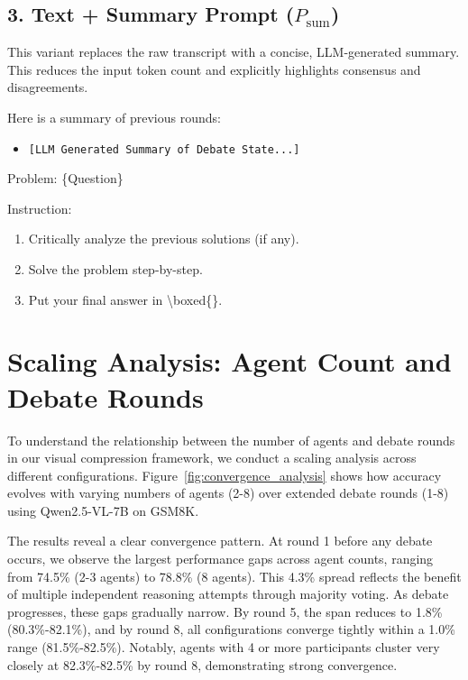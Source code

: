 \documentclass{article}
\theoremstyle{plain}
\theoremstyle{definition}
\theoremstyle{remark}
\begin{document}
\subsection{3. Text + Summary Prompt ($P_{\text{sum}}$)}
This variant replaces the raw transcript with a concise, LLM-generated summary. This reduces the input token count and explicitly highlights consensus and disagreements.

\begin{tcolorbox}[colback=gray!5!white,colframe=gray!50!black,title=\textbf{Summary Prompt Template}]
\small\ttfamily
Here is a summary of previous rounds:
\begin{itemize}[leftmargin=*,label={},noitemsep]
    \item \texttt{[LLM Generated Summary of Debate State...]}
\end{itemize}

Problem: \{Question\}

Instruction:
\begin{enumerate}[leftmargin=*,label=\arabic*.,noitemsep]
    \item Critically analyze the previous solutions (if any).
    \item Solve the problem step-by-step.
    \item Put your final answer in \textbackslash boxed\{\}.
\end{enumerate}
\end{tcolorbox}



\section{Scaling Analysis: Agent Count and Debate Rounds}
\label{sect:scale}

To understand the relationship between the number of agents and debate rounds in our visual compression framework, we conduct a scaling analysis across different configurations. Figure~\ref{fig:convergence_analysis} shows how accuracy evolves with varying numbers of agents (2-8) over extended debate rounds (1-8) using Qwen2.5-VL-7B on GSM8K. 

The results reveal a clear convergence pattern. At round 1 before any debate occurs, we observe the largest performance gaps across agent counts, ranging from 74.5\% (2-3 agents) to 78.8\% (8 agents). This 4.3\% spread reflects the benefit of multiple independent reasoning attempts through majority voting. As debate progresses, these gaps gradually narrow. By round 5, the span reduces to 1.8\% (80.3\%-82.1\%), and by round 8, all configurations converge tightly within a 1.0\% range (81.5\%-82.5\%). Notably, agents with 4 or more participants cluster very closely at 82.3\%-82.5\% by round 8, demonstrating strong convergence.
\end{document}
